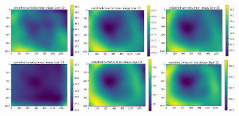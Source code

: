 \documentclass[letterpaper,11pt]{article}
\begin{document}
\begin{figure}[!ht]
\includegraphics[width=0.3\textwidth]{images/results/unmasked_smoothed_corrected_mean_image_layers/unmasked_smoothed_corrected_mean_image_layer_19}
\includegraphics[width=0.3\textwidth]{images/results/unmasked_smoothed_corrected_mean_image_layers/unmasked_smoothed_corrected_mean_image_layer_22}
\includegraphics[width=0.3\textwidth]{images/results/unmasked_smoothed_corrected_mean_image_layers/unmasked_smoothed_corrected_mean_image_layer_25}
\includegraphics[width=0.3\textwidth]{images/results/unmasked_smoothed_corrected_mean_image_layers/unmasked_smoothed_corrected_mean_image_layer_26}
\includegraphics[width=0.3\textwidth]{images/results/unmasked_smoothed_corrected_mean_image_layers/unmasked_smoothed_corrected_mean_image_layer_29}
\includegraphics[width=0.3\textwidth]{images/results/unmasked_smoothed_corrected_mean_image_layers/unmasked_smoothed_corrected_mean_image_layer_32}

\end{figure}
\end{document}
